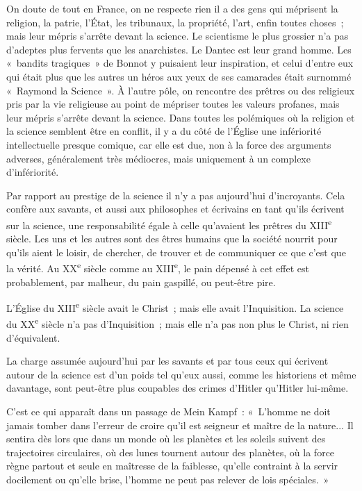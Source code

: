 \documentclass[french,twoside]{book} %
\begin{document}
On doute de tout en France, on ne respecte rien il a des gens qui méprisent la religion, la patrie, l’État, les tribunaux, la propriété, l'art, enfin toutes choses ; mais leur mépris s'arrête devant la science. Le scientisme le plus grossier n'a pas d'adeptes plus fervents que les anarchistes. Le Dantec est leur grand homme. Les « bandits tragiques » de Bonnot y puisaient leur inspiration, et celui d'entre eux qui était plus que les autres un héros aux yeux de ses camarades était surnommé « Raymond la Science ». À l'autre pôle, on rencontre des prêtres ou des religieux pris par la vie religieuse au point de mépriser toutes les valeurs profanes, mais leur mépris s'arrête devant la science. Dans toutes les polémiques où la religion et la science semblent être en conflit, il y a du côté de l'Église une infériorité intellectuelle presque comique, car elle est due, non à la force des arguments adverses, généralement très médiocres, mais uniquement à un complexe d'infériorité.\par
\par
Par rapport au prestige de la science il n'y a pas aujourd'hui d'incroyants. Cela confère aux savants, et aussi aux philosophes et écrivains en tant qu'ils écrivent sur la science, une responsabilité égale à celle qu'avaient les prêtres du XIII\textsuperscript{e} siècle. Les uns et les autres sont des êtres humains que la société nourrit pour qu'ils aient le loisir, de chercher, de trouver et de communiquer ce que c'est que la vérité. Au XX\textsuperscript{e} siècle comme au XIII\textsuperscript{e}, le pain dépensé à cet effet est probablement, par malheur, du pain gaspillé, ou peut-être pire.\par
L'Église du XIII\textsuperscript{e} siècle avait le Christ ; mais elle avait l'Inquisition. La science du XX\textsuperscript{e} siècle n'a pas d'Inquisition ; mais elle n'a pas non plus le Christ, ni rien d'équivalent.\par
La charge assumée aujourd'hui par les savants et par tous ceux qui écrivent autour de la science est d'un poids tel qu'eux aussi, comme les historiens et même davantage, sont peut-être plus coupables des crimes d'Hitler qu'Hitler lui-même.\par
C'est ce qui apparaît dans un passage de Mein Kampf : « L'homme ne doit jamais tomber dans l'erreur de croire qu'il est seigneur et maître de la nature... Il sentira dès lors que dans un monde où les planètes et les soleils suivent des trajectoires circulaires, où des lunes tournent autour des planètes, où la force règne partout et seule en maîtresse de la faiblesse, qu'elle contraint à la servir docilement ou qu'elle brise, l'homme ne peut pas relever de lois spéciales. »\par
\end{document}
